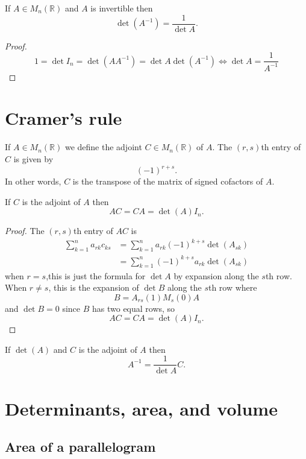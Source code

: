 \begin{corollary}
    If $A\in M_n(\mathbb R)$ and $A$ is invertible then \[\det{(A^{-1})}=\dfrac1{\det{A}}.\]
\end{corollary}

\begin{proof}
    \[1=\det{I_n}=\det{(AA^{-1})}=\det{A}\det{(A^{-1})}\iff\det{A}=\dfrac1{A^{-1}}\]
\end{proof}

\section{Cramer's rule}

\begin{definition}
    If $A\in M_n(\mathbb R)$ we define the adjoint $C\in M_n(\mathbb R)$ of $A$. The $(r,s)$th entry of $C$ is given by \[(-1)^{r+s}.\] In other words, $C$ is the transpose of the matrix of signed cofactors of $A$.
\end{definition}

\begin{proposition}
    If $C$ is the adjoint of $A$ then \[AC=CA=\det{(A)}I_n.\]
\end{proposition}

\begin{proof}
    The $(r,s)$th entry of $AC$ is 
    \begin{align*}
        \sum_{k=1}^{n}a_{rk}c_{ks}&=\sum_{k=1}^{n}a_{rk}(-1)^{k+s}\det{(A_{sk})}\\
        &=\sum_{k=1}^{n}(-1)^{k+s}a_{rk}\det{(A_{sk})}
    \end{align*}
    when $r=s$,this  is just the formula for $\det{A}$ by expansion along the $s$th row. When $r\neq s$, this is the expansion of $\det{B}$ along the $s$th row where \[B=A_{rs}(1)M_s(0)A\] and $\det{B}=0$ since $B$ has two equal rows, so \[AC=CA=\det{(A)}I_n.\]
\end{proof}

\begin{remark}
    If $\det{(A)}$ and $C$ is the adjoint of $A$ then \[A^{-1}=\dfrac{1}{\det{A}}C.\]
\end{remark}


\section{Determinants, area, and volume}

\subsection{Area of a parallelogram}

